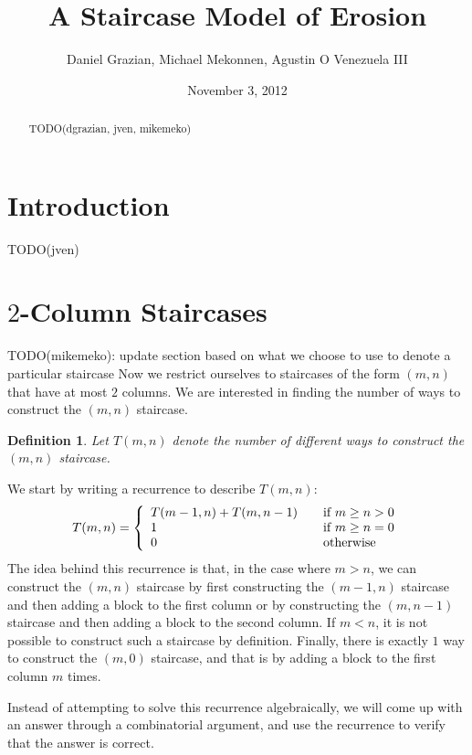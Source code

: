 \documentclass[12pt]{amsart}
\title{A Staircase Model of Erosion}
\author{Daniel Grazian, Michael Mekonnen, Agustin O Venezuela III}
\date{November 3, 2012}
\newtheorem{definition}[theorem]{Definition}
\begin{document}
\begin{abstract}
TODO(dgrazian, jven, mikemeko)
\end{abstract}

\maketitle

\section{Introduction\label{sec:intro}}
TODO(jven)

\section{$2$-Column Staircases\label{sec:2column}}
TODO(mikemeko): update section based on what we choose to use to denote a particular staircase
Now we restrict ourselves to staircases of the form $(m,n)$ that have at most $2$ columns. We are interested in finding the number of ways to construct the $(m,n)$ staircase.

\begin{definition}
Let $T(m,n)$ denote the number of different ways to construct the $(m,n)$ staircase.
\end{definition}

We start by writing a recurrence to describe $T(m,n)$:
\begin{equation}
T(m,n) = \left\{ 
  \begin{array}{l l}
    T(m-1,n) + T(m,n-1) & \quad \text{if $m \geq n > 0$}\\
    1 & \quad \text{if $m \geq n = 0$}\\
    0 & \quad \text{otherwise}\\
  \end{array} \right.
\label{eqn:2-recurrence}
\end{equation}
The idea behind this recurrence is that, in the case where $m > n$, we can construct the $(m,n)$ staircase by first constructing the $(m-1,n)$ staircase and then adding a block to the first column or by constructing the $(m,n-1)$ staircase and then adding a block to the second column. If $m < n$, it is not possible to construct such a staircase by definition. Finally, there is exactly $1$ way to construct the $(m,0)$ staircase, and that is by adding a block to the first column $m$ times.

Instead of attempting to solve this recurrence algebraically, we will come up with an answer through a combinatorial argument, and use the recurrence to verify that the answer is correct.
\end{document}
